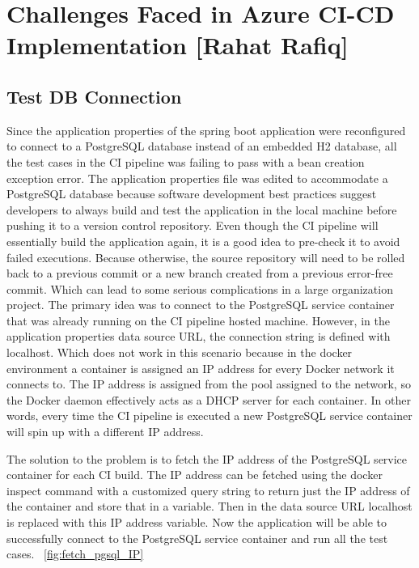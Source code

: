 \section{Challenges Faced in Azure CI-CD Implementation [Rahat Rafiq]}\label{sec:challenges_faced_in_azure_ci_cd}

\subsection{Test DB Connection}

Since the application properties of the spring boot application were reconfigured to connect to a PostgreSQL database instead of an embedded H2 database, all the test cases in the CI pipeline was failing to pass with a bean creation exception error. The application properties file was edited to accommodate a PostgreSQL database because software development best practices suggest developers to always build and test the application in the local machine before pushing it to a version control repository. Even though the CI pipeline will essentially build the application again, it is a good idea to pre-check it to avoid failed executions. Because otherwise, the source repository will need to be rolled back to a previous commit or a new branch created from a previous error-free commit. Which can lead to some serious complications in a large organization project. The primary idea was to connect to the PostgreSQL service container that was already running on the CI pipeline hosted machine. However, in the application properties data source URL, the connection string is defined with localhost. Which does not work in this scenario because in the docker environment a container is assigned an IP address for every Docker network it connects to. The IP address is assigned from the pool assigned to the network, so the Docker daemon effectively acts as a DHCP server for each container. In other words, every time the CI pipeline is executed a new PostgreSQL service container will spin up with a different IP address.

The solution to the problem is to fetch the IP address of the PostgreSQL service container for each CI build. The IP address can be fetched using the docker inspect command with a customized query string to return just the IP address of the container and store that in a variable. Then in the data source URL localhost is replaced with this IP address variable. Now the application will be able to successfully connect to the PostgreSQL service container and run all the test cases. ~\ref{fig:fetch_pgsql_IP} 

